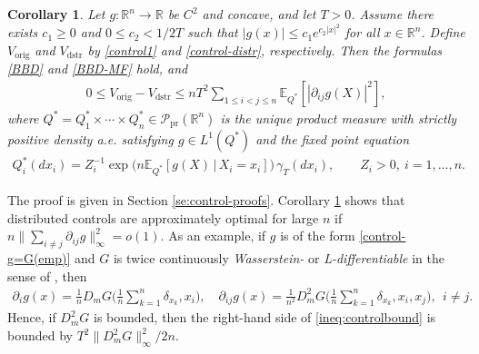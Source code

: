 \documentclass[11pt,reqno]{amsart}
\numberwithin{equation}{section}
\newtheorem{corollary}[theorem]{Corollary}
\theoremstyle{definition}
\def\E{{\mathbb E}}
\def\R{{\mathbb R}}
\def\P{{\mathcal P}}
\def\Pprod{\P_{\mathrm{pr}}}
\begin{document}
\begin{corollary} \label{co:stochcontrol}
	Let $g:\R^n\to\R$ be $C^2$ and concave, and let $T > 0$. Assume there exists $ c_1 \ge 0 $ and $0 \le c_2  < 1/2T $ such that $ |g(x)| \le  c_1 e^{c_2 |x|^2} $ for all $ x \in \R^n $. Define $V_{\mathrm{orig}}$ and $V_{\mathrm{dstr}}$ by \eqref{control1} and \eqref{control-distr}, respectively. Then the formulas \eqref{BBD} and \eqref{BBD-MF} hold, and
	\begin{align}
		0 \le V_{\mathrm{orig}} - V_{\mathrm{dstr}} \le  nT^2  \sum_{1 \le i < j \le n} \E_{Q^*}[|\partial_{ij}g(X)|^2], \label{ineq:controlbound}
	\end{align}
	where $Q^* = Q^*_1 \times \cdots \times Q^*_n \in \Pprod(\R^n)$ is the unique product measure with strictly positive density a.e. satisfying $g \in L^1(Q^*)$ and the fixed point equation
	\begin{align*}
		Q^*_i(dx_i) = Z_i^{-1} \exp \big(n\E_{Q^*}[g(X)\,|\,X_i=x_i]\big)\,\gamma_T(dx_i), \qquad  Z_i > 0, \ i=1,\ldots,n. 
	\end{align*}
\end{corollary}


	The proof is given in Section \ref{se:control-proofs}.
	Corollary \ref{co:stochcontrol} shows that distributed controls are approximately optimal for large $n$ if $n\|\sum_{i \neq j} \partial_{ij}g\|^2_\infty = o(1)$. As an example, if $g$ is of the form \eqref{control-g=G(emp)} and $G$ is twice continuously \emph{Wasserstein-} or  \emph{L-differentiable} in the sense of  \cite[Chapter 5.2]{carmona2018probabilistic}, then 
	\begin{align*}
		\partial_i g(x) = \frac{1}{n}D_mG\bigg(\frac{1}{n}\sum_{k=1}^n\delta_{x_k},x_i\bigg), \quad
		\partial_{ij} g(x) = \frac{1}{n^2}D_m^2G\bigg(\frac{1}{n}\sum_{k=1}^n\delta_{x_k},x_i,x_j\bigg), \ \ i \neq j.
	\end{align*}
	Hence, if $D_m^2G$ is bounded, then the right-hand side of \eqref{ineq:controlbound} is bounded by $T^2\|D_m^2G\|_\infty^2/2n$.
	
\end{document}
